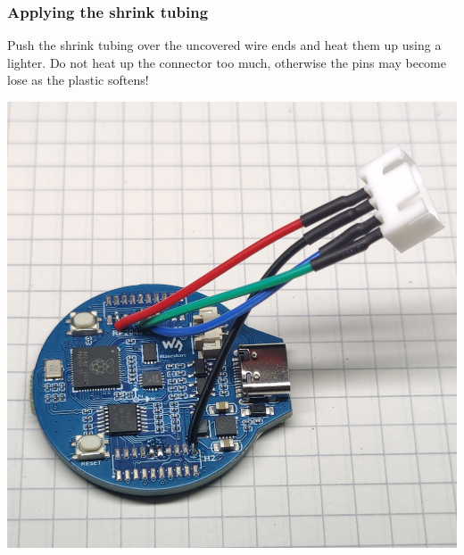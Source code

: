 \documentclass[]{article}
\begin{document}
\subsubsection{Applying the shrink tubing}
\begin{minipage}[t]{0.5\linewidth}
	\vspace{0pt}
	Push the shrink tubing over the uncovered wire ends and heat them up using a lighter. Do not heat up the connector too much, otherwise the pins may become lose as the plastic softens!
\end{minipage}
\hfill
\begin{minipage}[t]{0.4\linewidth}
	\vspace{0pt}
	\includegraphics[width=\linewidth]{images/01_displayunit/06_shrinktubing_plug.jpg}
\end{minipage}
\end{document}

